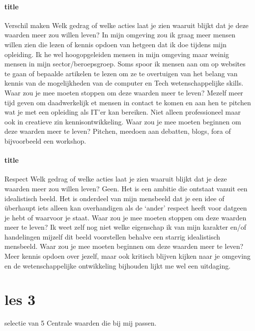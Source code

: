 \documentclass[11pt]{report}
\begin{document}
\paragraph{title}
Verschil maken
Welk gedrag of welke acties laat je zien waaruit blijkt dat je deze waarden meer zou willen leven? In mijn omgeving zou ik graag meer mensen willen zien die lezen of kennis opdoen van hetgeen dat ik doe tijdens mijn opleiding. Ik he wel hoogopgeleiden mensen in mijn omgeving maar weinig mensen in mijn sector/beroepsgroep. Soms spoor ik mensen aan om op websites te gaan of bepaalde artikelen te lezen om ze te overtuigen van het belang van kennis van de mogelijkheden van de computer en Tech wetenschappelijke skills.
Waar zou je mee moeten stoppen om deze waarden meer te leven? Mezelf meer tijd geven om daadwerkelijk et mensen in contact te komen en aan hen te pitchen wat je met een opleiding als IT’er kan bereiken. Niet alleen professioneel maar ook in creatieve zin kennisontwikkeling.
Waar zou je mee moeten beginnen om deze waarden meer te leven? Pitchen, meedoen aan debatten, blogs, fora of bijvoorbeeld een workshop.
\paragraph{title}
Respect
Welk gedrag of welke acties laat je zien waaruit blijkt dat je deze waarden meer zou willen leven?
Geen. Het is een ambitie die ontstaat vanuit een idealistisch beeld. Het is onderdeel van mijn mensbeeld dat je een idee of überhaupt iets alleen kan overhandigen als de ‘ander’ respect heeft voor datgeen je hebt of waarvoor je staat.
Waar zou je mee moeten stoppen om deze waarden meer te leven?
Ik weet zelf nog niet welke eigenschap ik van mijn karakter en/of handelingen mijzelf dit beeld voorstellen behalve een starrig idealistisch mensbeeld.
Waar zou je mee moeten beginnen om deze waarden meer te leven? Meer kennis opdoen over jezelf, maar ook kritisch blijven kijken naar je omgeving en de wetenschappelijke ontwikkeling bijhouden lijkt me wel een uitdaging.











\section{les 3}
selectie van 5 Centrale waarden die bij mij passen.
\end{document}
